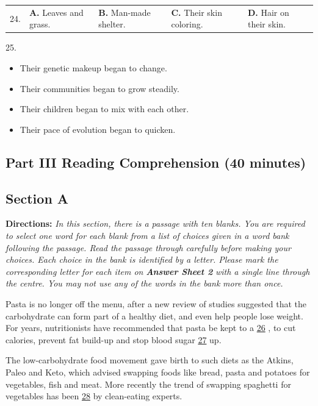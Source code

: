 \documentclass[UTF8,11pt]{ctexart}
\begin{document}
\noindent\begin{tabularx}{\linewidth}{@{}lXXXX@{}}24. & \textbf{A.} Leaves and grass. & \textbf{B.} Man-made shelter. & \textbf{C.} Their skin coloring. & \textbf{D.} Hair on their skin.\\\end{tabularx}\par

25.


\begin{itemize}[leftmargin=2em,itemsep=.2em,topsep=.4em]\item[A.] Their genetic makeup began to change.
\item[B.] Their communities began to grow steadily.
\item[C.] Their children began to mix with each other.
\item[D.] Their pace of evolution began to quicken.
\end{itemize}

\subsection*{\textbf{Part} III \textbf{Reading Comprehension} \textbf{(40 minutes)}}


\subsection*{\textbf{Section A}}


\textbf{Directions:}\textit{ In this section, there is a passage with ten blanks. You are required to select one word for each blank} \textit{from a list of choices given in a word bank following the passage. Read the passage through carefully before} \textit{making your choices. Each choice in the bank is identified by a letter. Please mark the corresponding letter for} \textit{each item on}\textbf{\textit{ Answer Sheet 2}}\textit{ with a single line through the centre. You may not use any of the words in the bank} \textit{more than once.}


Pasta is no longer off the menu, after a new review of studies suggested that the carbohydrate can form part of a healthy diet, and even help people lose weight. For years, nutritionists have recommended that pasta be kept to a \uline{26} , to cut calories, prevent fat build-up and stop blood sugar \uline{27} up.


The low-carbohydrate food movement gave birth to such diets as the Atkins, Paleo and Keto, which advised swapping foods like bread, pasta and potatoes for vegetables, fish and meat. More recently the trend of swapping spaghetti for vegetables has been \uline{28} by clean-eating experts.
\end{document}
